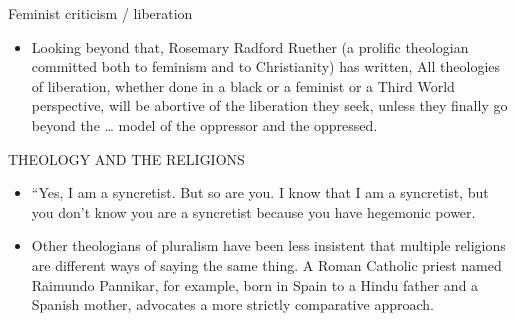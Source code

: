\begin{frame}[label=sec-5-1-2]{Feminist criticism / liberation}
\begin{itemize}
\item Looking beyond that, Rosemary Radford Ruether (a prolific theologian committed both to feminism and to Christianity) has written, All theologies of liberation, whether done in a black or a feminist or a Third World perspective, will be abortive of the liberation they seek, unless they finally go beyond the … model of the oppressor and the oppressed.
\end{itemize}
\end{frame}
\begin{frame}[label=sec-5-1-3]{THEOLOGY AND THE RELIGIONS}
\begin{itemize}
\item “Yes, I am a syncretist. But so are you. I know that I am a syncretist, but you don’t know you are a syncretist because you have hegemonic power.
\item Other theologians of pluralism have been less insistent that multiple religions are different ways of saying the same thing. A Roman Catholic priest named Raimundo Pannikar, for example, born in Spain to a Hindu father and a Spanish mother, advocates a more strictly comparative approach.
\end{itemize}
\end{frame}

